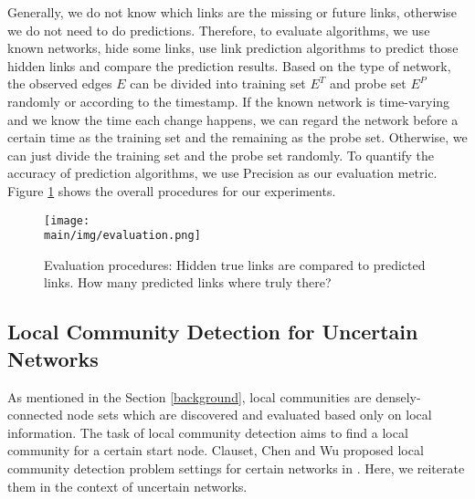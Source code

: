 \documentclass[\main/thesis.tex]{subfiles}
\begin{document}
Generally, we do not know which links are the missing or future links, otherwise we do not need to do predictions. Therefore, to evaluate algorithms, we use known networks, hide some links, use link prediction algorithms to predict those hidden links and compare the prediction results. Based on the type of network, the observed edges $E$ can be divided into training set $E^T$ and probe set $E^P$ randomly or according to the timestamp. If the known network is time-varying and we know the time each change happens, we can regard the network before a certain time as the training set and the remaining as the probe set. Otherwise, we can just divide the training set and the probe set randomly. To quantify the accuracy of prediction algorithms, we use Precision as our evaluation metric. Figure \ref{link-Evaluation-procedures} shows the overall procedures for our experiments. 
\begin{figure}
\centering
\texttt{[image: \\main/img/evaluation.png]}
\caption{Evaluation procedures: Hidden true links are compared to predicted links. How many predicted links where truly there?}
\label{link-Evaluation-procedures}
\end{figure}


\subsection{Local Community Detection for Uncertain Networks}
As mentioned in the Section \ref{background}, local communities are densely-connected node sets which are discovered and evaluated based only on local information. The task of local community detection aims to find a local community for a certain start node. Clauset, Chen and Wu proposed local community detection problem settings for certain networks in \cite{clauset2005finding,chen2009detecting,wu2012local}. Here, we reiterate them in the context of uncertain networks.
\end{document}
